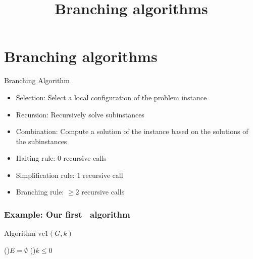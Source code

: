 


\title[Branching]
{Branching algorithms}

\begin{frame}
  \titlepage
\end{frame}

\lecturenotes{\maketitle}

\begin{frame}
 \tableofcontents
\end{frame}

\section{Branching algorithms}

\begin{frame}

 \begin{block}{Branching Algorithm}
  \begin{itemize}
   \item \alert{Selection}: Select a local configuration of the problem instance
   \item \alert{Recursion}: Recursively solve subinstances
   \item \alert{Combination}: Compute a solution of the instance based on the solutions of the subinstances
  \end{itemize}
 \end{block}
 
 \begin{itemize}
  \item \alert{Halting} rule: $0$ recursive calls
  \item \alert{Simplification} rule: $1$ recursive call
  \item \alert{Branching} rule: $\ge 2$ recursive calls
 \end{itemize}

\end{frame}

\begin{frame}
 \frametitle{Example: Our first \VC\ algorithm}

\begin{algorithm}[H]
\SetArgSty{}

\alert{Algorithm $\text{vc1}(G,k)$}\;
\BlankLine

   \If(){$E = \emptyset$} {
   }
   \ElseIf(){$k \le 0$} {
   }
\end{algorithm}

\end{frame}

